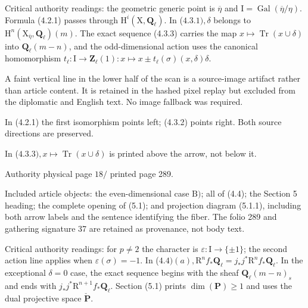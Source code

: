 \documentclass[10pt,leqno]{article}
\begin{document}
\noindent Critical authority readings: the geometric generic point is \(\overline{\eta }\) and \(\mathrm{I}=\operatorname{Gal}(\overline{\eta }/\eta )\). Formula (4.2.1) passes through \(\mathrm{H}^{i}(\mathrm{X},\mathbf{Q}_{\ell })\). In (\(4.3.1), \delta \) belongs to \(\mathrm{H}^{n}(\mathrm{X}_{\overline{\eta }},\mathbf{Q}_{\ell })(m)\). The exact sequence (4.3.3) carries the map \(x\longmapsto \operatorname{Tr}(x\cup \delta )\) into \(\mathbf{Q}_{\ell }(m- n)\), and the odd-dimensional action uses the canonical homomorphism \(t_{\ell }:\mathrm{I}\longrightarrow \mathbf{Z}_{\ell }(1): x\longmapsto x\pm t_{\ell }(\sigma )(x,\delta )\delta \).\par

\noindent \(\mathrm{A}\) faint vertical line in the lower half of the scan is a source-image artifact rather than article content. It is retained in the hashed pixel replay but excluded from the diplomatic and English text. No image fallback was required.\par

\noindent In (4.2.1) the first isomorphism points left; (4.3.2) points right. Both source directions are preserved.\par

\noindent In (\(4.3.3), x\longmapsto \operatorname{Tr}(x\cup \delta )\) is printed above the arrow, not below it.\par

\clearpage

\label{physical-18}\par\smallskip

\noindent Authority physical page \(18 /\) printed page 289.\par

\noindent Included article objects: the even-dimensional case \(\mathrm{B})\); all of (4.4); the Section 5 heading; the complete opening of (5.1); and projection diagram (5.1.1), including both arrow labels and the sentence identifying the fiber. The folio 289 and gathering signature 37 are retained as provenance, not body text.\par

\noindent Critical authority readings: for \(p\ne 2\) the character is \(\varepsilon :\mathrm{I}\longrightarrow \{\pm 1\}\); the second action line applies when \(\varepsilon (\sigma )=- 1\). In (\(4.4)(a), \mathrm{R}^{n} f_{*}\mathbf{Q}_{\ell }=j_{*}j^{*}\mathrm{R}^{n} f_{*}\mathbf{Q}_{\ell }\). In the exceptional \(\delta =0\) case, the exact sequence begins with the sheaf \(\mathbf{Q}_{\ell }(m- n)_{s}\) and ends with \(j_{*}j^{*}\mathrm{R}^{n+1}f_{*}\mathbf{Q}_{\ell }\). Section (5.1) prints \(\operatorname{dim}(\mathbf{P})\geq 1\) and uses the dual projective space \(\check{\mathbf{P}}\).\par
\end{document}
